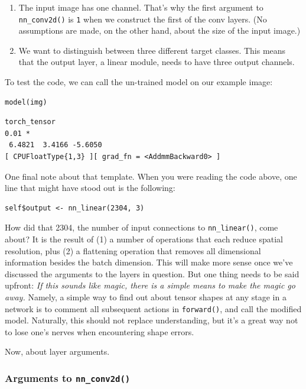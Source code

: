 \documentclass[
  letterpaper,
]{krantz}
\providecommand{\tightlist}{%
  \setlength{\itemsep}{0pt}\setlength{\parskip}{0pt}}\usepackage{longtable,booktabs,array}
\begin{document}
\begin{enumerate}
\def\labelenumi{\arabic{enumi}.}
\tightlist
\item
  The input image has one channel. That's why the first argument to
  \texttt{nn\_conv2d()} is \texttt{1} when we construct the first of the
  conv layers. (No assumptions are made, on the other hand, about the
  size of the input image.)
\item
  We want to distinguish between three different target classes. This
  means that the output layer, a linear module, needs to have three
  output channels.
\end{enumerate}

To test the code, we can call the un-trained model on our example image:

\begin{verbatim}
model(img)
\end{verbatim}

\begin{verbatim}
torch_tensor
0.01 *
 6.4821  3.4166 -5.6050
[ CPUFloatType{1,3} ][ grad_fn = <AddmmBackward0> ]
\end{verbatim}

One final note about that template. When you were reading the code
above, one line that might have stood out is the following:

\begin{verbatim}
self$output <- nn_linear(2304, 3)
\end{verbatim}

How did that 2304, the number of input connections to
\texttt{nn\_linear()}, come about? It is the result of (1) a number of
operations that each reduce spatial resolution, plus (2) a flattening
operation that removes all dimensional information besides the batch
dimension. This will make more sense once we've discussed the arguments
to the layers in question. But one thing needs to be said upfront:
\emph{If this sounds like magic, there is a simple means to make the
magic go away.} Namely, a simple way to find out about tensor shapes at
any stage in a network is to comment all subsequent actions in
\texttt{forward()}, and call the modified model. Naturally, this should
not replace understanding, but it's a great way not to lose one's nerves
when encountering shape errors.

Now, about layer arguments.

\hypertarget{arguments-to-nn_conv2d}{%
\subsubsection{\texorpdfstring{Arguments to
\texttt{nn\_conv2d()}}{Arguments to nn\_conv2d()}}\label{arguments-to-nn_conv2d}}
\end{document}
